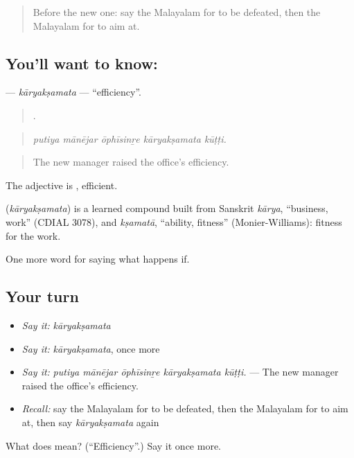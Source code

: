 \label{lesson:ML-C447-karyaksamata}



\begin{quote}
Before the new one: say the Malayalam for to be defeated, then the Malayalam for to aim at.
\end{quote}

\subsection*{You'll want to know: }
\textbf{} — \emph{kāryakṣamata} — \textquotedblleft{}efficiency\textquotedblright{}.

\begin{quote}
    .
\end{quote}

\begin{quote}
\emph{putiya mānējar ōphīsinṟe kāryakṣamata kūṭṭi.}
\end{quote}

\begin{quote}
The new manager raised the office's efficiency.
\end{quote}

The adjective is , efficient.

\begin{cousinweb}
\textbf{} (\emph{kāryakṣamata}) is a learned compound built from Sanskrit \emph{kārya}, \textquotedblleft{}business, work\textquotedblright{} (CDIAL 3078), and \emph{kṣamatā}, \textquotedblleft{}ability, fitness\textquotedblright{} (Monier-Williams): fitness for the work.
\end{cousinweb}

\begin{grammarlens}[title={What you've built}]
One more word for saying what happens if.
\end{grammarlens}

\subsection*{Your turn}
\begin{itemize}
\raggedright
  \item \emph{Say it:} \emph{kāryakṣamata}
  \item \emph{Say it:} \emph{kāryakṣamata}, once more
  \item \emph{Say it:} \emph{putiya mānējar ōphīsinṟe kāryakṣamata kūṭṭi.} — The new manager raised the office's efficiency.
  \item \emph{Recall:} say the Malayalam for to be defeated, then the Malayalam for to aim at, then say \emph{kāryakṣamata} again
\end{itemize}

\begin{tcolorbox}[breakable,colback=teal!4,colframe=teal!35!black,title={Before you move on}]
What does  mean? (\textquotedblleft{}Efficiency\textquotedblright{}.) Say it once more.
\end{tcolorbox}
